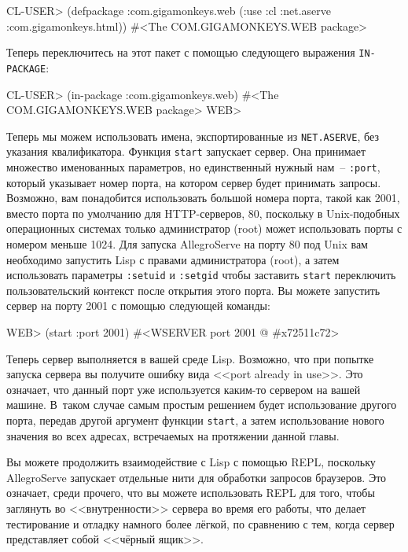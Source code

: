 \begin{myverb}
CL-USER> (defpackage :com.gigamonkeys.web
            (:use :cl :net.aserve :com.gigamonkeys.html))
#<The COM.GIGAMONKEYS.WEB package>
\end{myverb}

Теперь переключитесь на этот пакет с помощью следующего выражения \lstinline{IN-PACKAGE}:

\begin{myverb}
CL-USER> (in-package :com.gigamonkeys.web)
#<The COM.GIGAMONKEYS.WEB package>
WEB>
\end{myverb} 

Теперь мы можем использовать имена, экспортированные из \lstinline{NET.ASERVE}, без указания
квалификатора. Функция \lstinline{start} запускает сервер. Она принимает множество именованных
параметров, но единственный нужный нам~-- \lstinline{:port}, который указывает номер порта, на
котором сервер будет принимать запросы.  Возможно, вам понадобится использовать большой
номера порта, такой как 2001, вместо порта по умолчанию для HTTP-серверов, 80, поскольку в
Unix-подобных операционных системах только администратор (root) может использовать порты с
номером меньше 1024. Для запуска AllegroServe на порту 80 под Unix вам необходимо
запустить Lisp с правами администратора (root), а затем использовать параметры
\lstinline{:setuid} и \lstinline{:setgid} чтобы заставить \lstinline{start} переключить пользовательский
контекст после открытия этого порта. Вы можете запустить сервер на порту 2001 с помощью
следующей команды:

\begin{myverb}
WEB> (start :port 2001)
#<WSERVER port 2001 @ #x72511c72>
\end{myverb}

Теперь сервер выполняется в вашей среде Lisp. Возможно, что при попытке запуска сервера вы
получите ошибку вида <<port already in use>>. Это означает, что данный порт уже
используется каким-то сервером на вашей машине. В~таком случае самым простым решением
будет использование другого порта, передав другой аргумент функции \lstinline{start}, а затем
использование нового значения во всех адресах, встречаемых на протяжении данной главы.

Вы можете продолжить взаимодействие с Lisp с помощью REPL, поскольку AllegroServe
запускает отдельные нити для обработки запросов браузеров. Это означает, среди прочего,
что вы можете использовать REPL для того, чтобы заглянуть во <<внутренности>> сервера во
время его работы, что делает тестирование и отладку намного более лёгкой, по сравнению с
тем, когда сервер представляет собой <<чёрный ящик>>.

